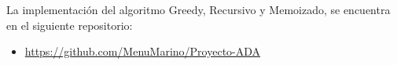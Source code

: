 \documentclass[12pt,a4,paper]{article}
\begin{document}
La implementación del algoritmo Greedy, Recursivo y Memoizado, se encuentra en el siguiente repositorio:

\begin{itemize}
    \item \url{https://github.com/MenuMarino/Proyecto-ADA}
\end{itemize}

\newpage

\end{document}
